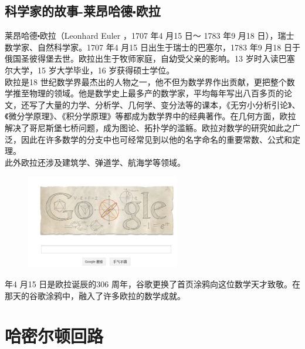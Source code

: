 \documentclass[11pt,a4paper,openany]{book}
\begin{document}
\subsection{科学家的故事-莱昂哈德$\centerdot$欧拉}
\indent 莱昂哈德$\centerdot$欧拉（Leonhard Euler ，1707 年4 月15 日～ 1783 年9 月18 日），瑞士数学家、自然科学家。1707 年4 月15 日出生于瑞士的巴塞尔，1783 年9 月18 日于俄国圣彼得堡去世。欧拉出生于牧师家庭，自幼受父亲的影响。13 岁时入读巴塞尔大学，15 岁大学毕业，16 岁获得硕士学位。\\
\indent 欧拉是18 世纪数学界最杰出的人物之一，他不但为数学界作出贡献，更把整个数学推至物理的领域。他是数学史上最多产的数学家，平均每年写出八百多页的论文，还写了大量的力学、分析学、几何学、变分法等的课本，《无穷小分析引论》、《微分学原理》、《积分学原理》等都成为数学界中的经典著作。在几何方面，欧拉解决了哥尼斯堡七桥问题，成为图论、拓扑学的滥觞。欧拉对数学的研究如此之广泛，因此在许多数学的分支中也可经常见到以他的名字命名的重要常数、公式和定理。\\
\indent 此外欧拉还涉及建筑学、弹道学、航海学等领域。\\
\begin{figure}[h]
  \centering
  \includegraphics[width=0.6\textwidth]{oula1.png}
\end{figure}
 年4 月15 日是欧拉诞辰的306 周年，谷歌更换了首页涂鸦向这位数学天才致敬。在那天的谷歌涂鸦中，融入了许多欧拉的数学成就。

\section{哈密尔顿回路}
\end{document}
